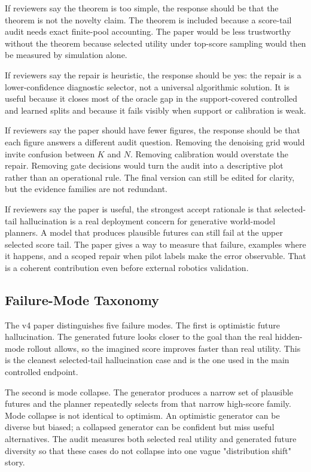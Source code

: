 \documentclass{article}
\begin{document}
If reviewers say the theorem is too simple, the response should be that the
theorem is not the novelty claim. The theorem is included because a
score-tail audit needs exact finite-pool accounting. The paper would be less
trustworthy without the theorem because selected utility under top-score
sampling would then be measured by simulation alone.

If reviewers say the repair is heuristic, the response should be yes: the
repair is a lower-confidence diagnostic selector, not a universal algorithmic
solution. It is useful because it closes most of the oracle gap in the
support-covered controlled and learned splits and because it fails visibly
when support or calibration is weak.

If reviewers say the paper should have fewer figures, the response should be
that each figure answers a different audit question. Removing the denoising
grid would invite confusion between $K$ and $N$. Removing calibration would
overstate the repair. Removing gate decisions would turn the audit into a
descriptive plot rather than an operational rule. The final version can still
be edited for clarity, but the evidence families are not redundant.

If reviewers say the paper is useful, the strongest accept rationale is that
selected-tail hallucination is a real deployment concern for generative
world-model planners. A model that produces plausible futures can still fail
at the upper selected score tail. The paper gives a way to measure that
failure, examples where it happens, and a scoped repair when pilot labels make
the error observable. That is a coherent contribution even before external
robotics validation.

\subsection{Failure-Mode Taxonomy}
\label{app:v4-failure-taxonomy}

The v4 paper distinguishes five failure modes. The first is optimistic future
hallucination. The generated future looks closer to the goal than the real
hidden-mode rollout allows, so the imagined score improves faster than real
utility. This is the cleanest selected-tail hallucination case and is the one
used in the main controlled endpoint.

The second is mode collapse. The generator produces a narrow set of plausible
futures and the planner repeatedly selects from that narrow high-score family.
Mode collapse is not identical to optimism. An optimistic generator can be
diverse but biased; a collapsed generator can be confident but miss useful
alternatives. The audit measures both selected real utility and generated
future diversity so that these cases do not collapse into one vague
"distribution shift" story.
\end{document}
